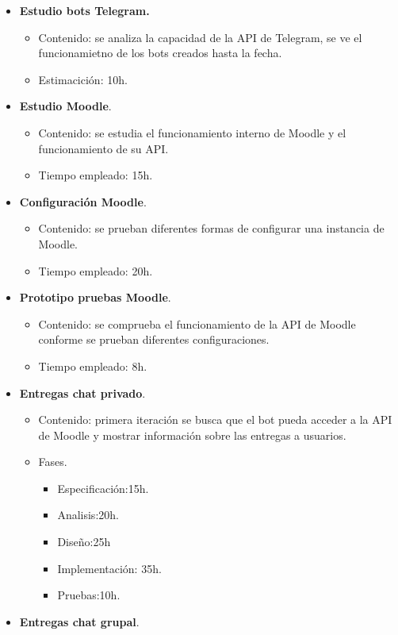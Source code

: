 \begin{itemize}
\item \textbf{Estudio bots Telegram.}
\begin{itemize}
\item Contenido: se analiza la capacidad de la API de Telegram, se ve el funcionamietno de los bots creados hasta la fecha.
\item Estimacición: 10h.
\end{itemize}
\item \textbf{Estudio Moodle}. 
\begin{itemize}
\item Contenido: se estudia el funcionamiento interno de Moodle y el funcionamiento de su API.
\item Tiempo empleado: 15h.
\end{itemize}
\item \textbf{Configuración Moodle}. 
\begin{itemize}
\item Contenido: se prueban diferentes formas de configurar una instancia de Moodle.
\item Tiempo empleado: 20h.
\end{itemize}
\item \textbf{Prototipo pruebas Moodle}. 
\begin{itemize}
\item Contenido: se comprueba el funcionamiento de la API de Moodle conforme se prueban diferentes configuraciones.
\item Tiempo empleado: 8h.
\end{itemize}
\item \textbf{Entregas chat privado}. 
\begin{itemize}
\item Contenido: primera iteración se busca que el bot pueda acceder a la API de Moodle y mostrar información sobre las entregas a usuarios.
\item Fases.
\begin{itemize}
\item Especificación:15h.
\item Analisis:20h.
\item Diseño:25h
\item Implementación: 35h.
\item Pruebas:10h.
\end{itemize}
\end{itemize}
\item \textbf{Entregas chat grupal}. 
\begin{itemize}

\end{itemize}
\end{itemize}
